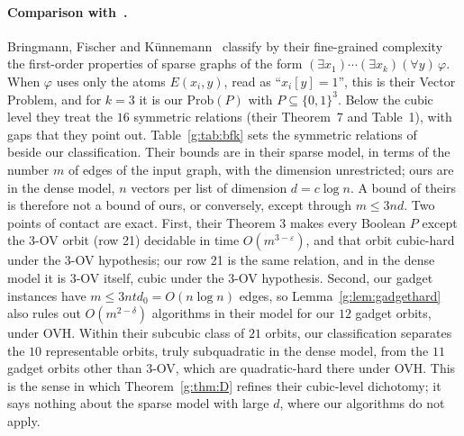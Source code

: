 \documentclass[11pt]{article}
\theoremstyle{definition}
\theoremstyle{remark}
\newcommand{\Prob}{\mathrm{Prob}}
\newcommand{\eps}{\varepsilon}
\begin{document}
\paragraph{Comparison with~\cite{BFK19}.} Bringmann, Fischer and Künnemann~\cite{BFK19} classify by their fine-grained complexity the first-order properties of sparse graphs of the form $(\exists x_1)\cdots(\exists x_k)\allowbreak(\forall y)\,\varphi$. When $\varphi$ uses only the atoms $E(x_i,y)$, read as ``$x_i[y]=1$'', this is their Vector Problem, and for $k=3$ it is our $\Prob(P)$ with $P\subseteq\{0,1\}^3$. Below the cubic level they treat the $16$ symmetric relations (their Theorem~7 and Table~1), with gaps that they point out. Table~\ref{g:tab:bfk} sets the symmetric relations of~\cite[Theorem~7, Table~1]{BFK19} beside our classification. Their bounds are in their sparse model, in terms of the number $m$ of edges of the input graph, with the dimension unrestricted; ours are in the dense model, $n$ vectors per list of dimension $d=c\log n$. A bound of theirs is therefore not a bound of ours, or conversely, except through $m\le3nd$. Two points of contact are exact. First, their Theorem 3 makes every Boolean $P$ except the $3$-OV orbit (row 21) decidable in time $O(m^{3-\eps})$, and that orbit cubic-hard under the $3$-OV hypothesis; our row 21 is the same relation, and in the dense model it is $3$-OV itself, cubic under the $3$-OV hypothesis. Second, our gadget instances have $m\le3ntd_0=O(n\log n)$ edges, so Lemma~\ref{g:lem:gadgethard} also rules out $O(m^{2-\delta})$ algorithms in their model for our $12$ gadget orbits, under OVH. Within their subcubic class of $21$ orbits, our classification separates the $10$ representable orbits, truly subquadratic in the dense model, from the $11$ gadget orbits other than $3$-OV, which are quadratic-hard there under OVH. This is the sense in which Theorem~\ref{g:thm:D} refines their cubic-level dichotomy; it says nothing about the sparse model with large $d$, where our algorithms do not apply.
\end{document}
